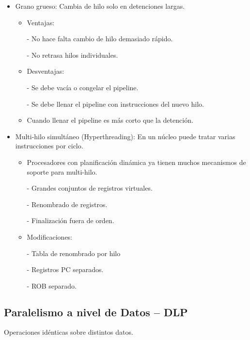 \documentclass[12pt, twoside, openright]{report} %
\begin{document}
\begin{itemize}
\begin{itemize}
\begin{itemize}
              \item Grano grueso: Cambia de hilo solo en detenciones largas.
              \begin{itemize}
                \item Ventajas:
                
                - No hace falta cambio de hilo demasiado rápido.

                - No retrasa hilos individuales.
                \item Desventajas:
                
                - Se debe vacía o congelar el pipeline.

                - Se debe llenar el pipeline con instrucciones del nuevo hilo.
                \item Cuando llenar el pipeline es más corto que la detención.
              \end{itemize}
                  
              \item Multi-hilo simultáneo (Hyperthreading): En un núcleo puede tratar varias instrucciones por ciclo.
              \begin{itemize}
                \item Procesadores con planificación dinámica ya tienen muchos mecanismos de soporte para multi-hilo.
                
                - Grandes conjuntos de registros virtuales.

                - Renombrado de registros.

                - Finalización fuera de orden.
                \item Modificaciones:
                
                - Tabla de renombrado por hilo

                - Registros PC separados.

                - ROB separado.
              \end{itemize}
                  
            \end{itemize}
          \end{itemize}
      \end{itemize}
      \subsection{Paralelismo a nivel de Datos -- DLP}
          Operaciones idénticas sobre distintos datos.
  
\end{document}

